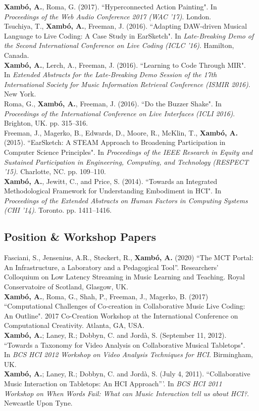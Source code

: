 \documentclass[10pt, a4paper]{article}
\newcommand{\years}[1]{\marginnote{\scriptsize #1}}
\begin{document}
{\years{2017a}\textbf{Xambó, A.}, Roma, G. (2017). “Hyperconnected Action Painting". In \emph{Proceedings of the Web Audio Conference 2017 (WAC '17)}. London.\\
\years{2016c}Tsuchiya, T., \textbf{Xambó, A.}, Freeman, J. (2016). “Adapting DAW-driven Musical Language to Live Coding: A Case Study in EarSketch". In \emph{Late-Breaking Demo of the Second International Conference on Live Coding (ICLC '16)}. Hamilton, Canada.\\ 
\years{2016b}\textbf{Xambó, A.}, Lerch, A., Freeman, J. (2016). “Learning to Code Through MIR". In \emph{Extended Abstracts for the Late-Breaking Demo Session of the 17th International Society for Music Information Retrieval Conference (ISMIR 2016)}. New York.\\
\years{2016a}Roma, G., \textbf{Xambó, A.}, Freeman, J. (2016). “Do the Buzzer Shake". In \emph{Proceedings of the International Conference on Live Interfaces (ICLI 2016)}. Brighton, UK. pp. 315--316.\\
\years{2015}Freeman, J., Magerko, B., Edwards, D., Moore, R., McKlin, T., \textbf{Xambó, A.} (2015). “EarSketch: A STEAM Approach to Broadening Participation in Computer Science Principles". In \emph{Proceedings of the IEEE Research in Equity and Sustained Participation in Engineering, Computing, and Technology (RESPECT '15)}. Charlotte, NC. pp. 109--110.\\
\years{2014}\textbf{Xambó, A.}, Jewitt, C., and Price, S. (2014). “Towards an Integrated Methodological Framework for Understanding Embodiment in HCI". In \emph{Proceedings of the Extended Abstracts on Human Factors in Computing Systems (CHI '14)}. Toronto. pp. 1411--1416.

\subsection*{Position \& Workshop Papers}
\noindent

\years{2020}Fasciani, S., Jensenius, A.R., Støckert, R., \textbf{Xambó, A.} (2020) ``The MCT Portal: An Infrastructure, a Laboratory and a Pedagogical Tool''. Researchers’ Colloquium on Low Latency Streaming in Music Learning and Teaching. Royal Conservatoire of Scotland, Glasgow, UK.\\
\years{2017}\textbf{Xambó, A.}, Roma, G., Shah, P., Freeman, J., Magerko, B. (2017) “Computational Challenges of Co-creation in Collaborative Music Live Coding: An Outline". 2017 Co-Creation Workshop at the International Conference on Computational Creativity. Atlanta, GA, USA.\\ 
\years{2012}\textbf{Xambó, A.}; Laney, R.; Dobbyn, C. and Jordà, S. (September 11, 2012). “Towards a Taxonomy for Video Analysis on Collaborative Musical Tabletops". In \emph{BCS HCI 2012 Workshop on Video Analysis Techniques for HCI}. Birmingham, UK.\\
\years{2011}\textbf{Xambó, A.}; Laney, R.; Dobbyn, C. and Jordà, S. (July 4, 2011). ``Collaborative Music Interaction on Tabletops: An HCI Approach'''. In \emph{BCS HCI 2011 Workshop on When Words Fail: What can Music Interaction tell us about HCI?}. Newcastle Upon Tyne.

}
\end{document}
